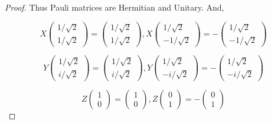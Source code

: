 \documentclass{article}
\begin{document}
\begin{proof}
Thus Pauli matrices are Hermitian and Unitary. And,





$$X\begin{pmatrix}1/\sqrt{2} \\ 1/\sqrt{2}\end{pmatrix} = \begin{pmatrix}1/\sqrt{2} \\ 1/\sqrt{2}\end{pmatrix}, X\begin{pmatrix}1/\sqrt{2} \\ -1/\sqrt{2}\end{pmatrix} = - \begin{pmatrix}1/\sqrt{2} \\ -1/\sqrt{2}\end{pmatrix}$$

$$Y\begin{pmatrix}1/\sqrt{2} \\ i/\sqrt{2}\end{pmatrix} = \begin{pmatrix}1/\sqrt{2} \\ i/\sqrt{2}\end{pmatrix}, Y\begin{pmatrix}1/\sqrt{2} \\ -i/\sqrt{2}\end{pmatrix} = -\begin{pmatrix}1/\sqrt{2} \\ -i/\sqrt{2}\end{pmatrix}$$

$$Z\begin{pmatrix}1 \\ 0\end{pmatrix} = \begin{pmatrix}1 \\ 0\end{pmatrix}, Z\begin{pmatrix}0 \\ 1\end{pmatrix} = -\begin{pmatrix}0 \\ 1\end{pmatrix}$$
\end{proof}
\end{document}
